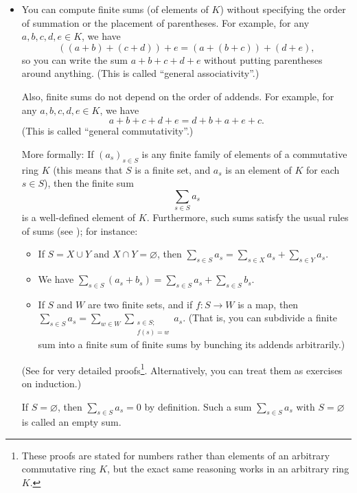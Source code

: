 \begin{itemize}
\item You can compute finite sums (of elements of $K$) without specifying the
order of summation or the placement of parentheses. For example, for any
$a,b,c,d,e\in K$, we have%
\[
\left(  \left(  a+b\right)  +\left(  c+d\right)  \right)  +e=\left(  a+\left(
b+c\right)  \right)  +\left(  d+e\right)  ,
\]
so you can write the sum $a+b+c+d+e$ without putting parentheses around
anything. (This is called \textquotedblleft general
associativity\textquotedblright.)

Also, finite sums do not depend on the order of addends. For example, for any
$a,b,c,d,e\in K$, we have%
\[
a+b+c+d+e=d+b+a+e+c.
\]
(This is called \textquotedblleft general commutativity\textquotedblright.)

More formally: If $\left(  a_{s}\right)  _{s\in S}$ is any finite family of
elements of a commutative ring $K$ (this means that $S$ is a finite set, and
$a_{s}$ is an element of $K$ for each $s\in S$), then the finite sum%
\[
\sum\limits_{s\in S}a_{s}%
\]
is a well-defined element of $K$. Furthermore, such sums satisfy the usual
rules of sums (see \cite[\S 1.4.2]{detnotes}); for instance:

\begin{itemize}
\item If $S=X\cup Y$ and $X\cap Y=\varnothing$, then $\sum\limits_{s\in
S}a_{s}=\sum\limits_{s\in X}a_{s}+\sum\limits_{s\in Y}a_{s}$.

\item We have $\sum\limits_{s\in S}\left(  a_{s}+b_{s}\right)  =\sum
\limits_{s\in S}a_{s}+\sum\limits_{s\in S}b_{s}$.

\item If $S$ and $W$ are two finite sets, and if $f:S\rightarrow W$ is a map,
then $\sum_{s\in S}a_{s}=\sum_{w\in W}\sum_{\substack{s\in S;\\f\left(
s\right)  =w}}a_{s}$. (That is, you can subdivide a finite sum into a finite
sum of finite sums by bunching its addends arbitrarily.)
\end{itemize}

(See \cite[\S 2.14]{detnotes} for very detailed proofs\footnote{These proofs
are stated for numbers rather than elements of an arbitrary commutative ring
$K$, but the exact same reasoning works in an arbitrary ring $K$.}.
Alternatively, you can treat them as exercises on induction.)

If $S=\varnothing$, then $\sum\limits_{s\in S}a_{s}=0$ by definition. Such a
sum $\sum\limits_{s\in S}a_{s}$ with $S=\varnothing$ is called an empty sum.


\end{itemize}
